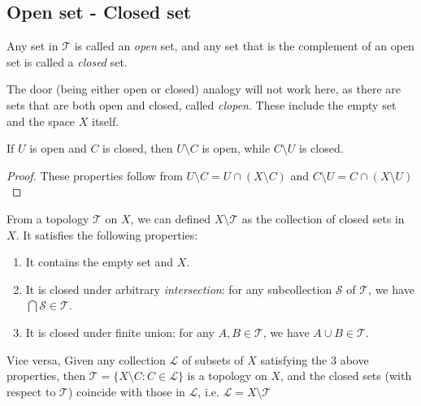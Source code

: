 \documentclass{treatise}
\begin{document}
\subsection{Open set - Closed set}
Any set in $\mathcal{T}$ is called an \emph{open} set, and any set that is the complement of an open set is called a \emph{closed} set.
\begin{remark}
The door (being either open or closed) analogy will not work here, as there are sets that are both open and closed, called \emph{clopen}. These include the empty set and the space $X$ itself.
\end{remark}
\begin{lemma} \label{clopen-complement}
If $U$ is open and $C$ is closed, then $U \setminus C$ is open, while $C \setminus U$ is closed.
\end{lemma}
\begin{proof}
These properties follow from $U \setminus C = U \cap (X \setminus C)$ and $C \setminus U = C \cap (X \setminus U)$
\end{proof}
\begin{theorem} \label{equiv-topo-closed-set}
From a topology $\mathcal{T}$ on $X$, we can defined $X \setminus \mathcal{T}$ as the collection of closed sets in $X$. It satisfies the following properties:
\begin{enumerate}
    \item It contains the empty set and $X$.
    \item It is closed under arbitrary \textit{intersection}: for any subcollection $\mathcal{S}$ of $\mathcal{T}$, we have $\bigcap \mathcal{S} \in \mathcal{T}$.
    \item It is closed under finite union: for any $A, B \in \mathcal{T}$, we have $A \cup B \in \mathcal{T}$.
\end{enumerate}
Vice versa, Given any collection $\mathcal{L}$ of subsets of $X$ satisfying the 3 above properties, then $\mathcal{T} = \{ X \setminus C : C \in \mathcal{L} \}$ is a topology on $X$, and the closed sets (with respect to $\mathcal{T}$) coincide with those in $\mathcal{L}$, i.e. $\mathcal{L} = X \setminus \mathcal{T}$
\end{theorem}
\end{document}
